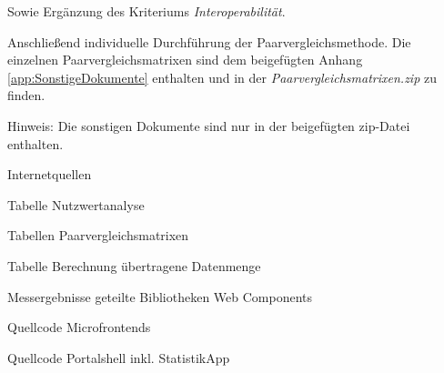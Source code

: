 Sowie Ergänzung des Kriteriums \textit{Interoperabilität}.

Anschließend individuelle Durchführung der Paarvergleichsmethode. Die einzelnen Paarvergleichsmatrixen sind dem beigefügten Anhang \ref{app:SonstigeDokumente} enthalten und in der \textit{Paarvergleichsmatrixen.zip} zu finden.

\newpage
{}\label{app:SonstigeDokumente}
Hinweis: Die sonstigen Dokumente sind nur in der beigefügten zip-Datei enthalten.\\

\begin{compactenum}
	\item Internetquellen
	\item Tabelle Nutzwertanalyse
	\item Tabellen Paarvergleichsmatrixen
	\item Tabelle Berechnung übertragene Datenmenge
	\item Messergebnisse geteilte Bibliotheken Web Components
	\item Quellcode Microfrontends
	\item Quellcode Portalshell inkl. StatistikApp
\end{compactenum}